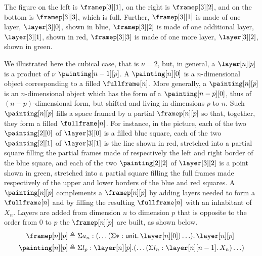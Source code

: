 \documentclass[10pt]{art.cls/art}
\newcommand{\unittype}{\ensuremath{\mathsf{unit}}}
\newcommand{\unitpoint}{\ensuremath{\ast}}
\newcommand{\defeq}{\ensuremath{\triangleq}}
\begin{document}
The figure on the left is $\framep[3][1]$, on the right is $\framep[3][2]$, and on the bottom is $\framep[3][3]$, which is full. Further, $\framep[3][1]$ is made of one layer, $\layer[3][0]$, shown in blue, $\framep[3][2]$ is made of one additional layer, $\layer[3][1]$, shown in red, $\framep[3][3]$ is made of one more layer, $\layer[3][2]$, shown in green.

We illustrated here the cubical case, that is $\nu = 2$, but, in general, a $\layer[n][p]$ is a product of $\nu$ $\painting[n - 1][p]$. A $\painting[n][0]$ is a $n$-dimensional object corresponding to a filled $\fullframe[n]$. More generally, a $\painting[n][p]$ is an $n$-dimensional object which has the form of a $\painting[n-p][0]$, thus of $(n-p)$-dimensional form, but shifted and living in dimensions $p$ to $n$. Such $\painting[n][p]$ fills a space framed by a partial $\framep[n][p]$ so that, together, they form a filled $\fullframe[n]$. For instance, in the picture, each of the two $\painting[2][0]$ of $\layer[3][0]$ is a filled blue square, each of the two $\painting[2][1]$ of $\layer[3][1]$ is the line shown in red, stretched into a partial square filling the partial frames made of respectively the left and right border of the blue square, and each of the two $\painting[2][2]$ of $\layer[3][2]$ is a point shown in green, stretched into a partial square filling the full frames made respectively of the upper and lower borders of the blue and red squares. A $\painting[n][p]$ complements a $\framep[n][p]$ by adding layers needed to form a $\fullframe[n]$ and by filling the resulting $\fullframe[n]$ with an inhabitant of $X_n$. Layers are added from dimension $n$ to dimension $p$ that is opposite to the order from $0$ to $p$ the $\framep[n][p]$ are built, as shown below.
\begin{align*}
  \framep[n][p]   & \defeq \Sigma a_n: (\ldots (\Sigma \unitpoint: \unittype .\, \layer[n][0]) \ldots) .\, \layer[n][p] \\
  \painting[n][p] & \defeq \Sigma l_p: \layer[n][p]. (\ldots (\Sigma l_n: \layer[n][n - 1] .\, X_n) \ldots)
\end{align*}
\end{document}
